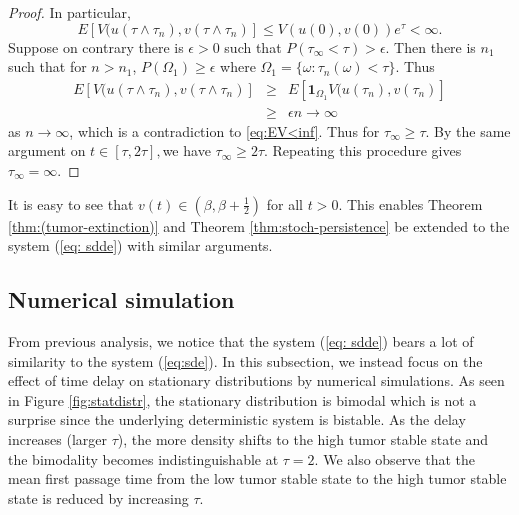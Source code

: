 \documentclass{aims}
\theoremstyle{definition}
\begin{document}
\begin{proof}
 In particular, 
 \begin{equation}
 E[V(u(\tau\land\tau_{n}),v(\tau\land\tau_{n})]\le V(u(0),v(0))e^{\tau}<\infty.\label{eq:EV<inf}
 \end{equation}
 Suppose on contrary there is $\epsilon>0$ such that $P(\tau_{\infty}<\tau)>\epsilon$.
 Then there is $n_{1}$ such that for $n>n_{1}$, $P(\Omega_{1})\ge\epsilon$
 where $\Omega_{1}=\{\omega:\tau_{n}(\omega)<\tau\}$. Thus 
 \begin{eqnarray*}
 E[V(u(\tau\land\tau_{n}),v(\tau\land\tau_{n})] & \ge & E[\boldsymbol{1}_{\Omega_{1}}V(u(\tau_{n}),v(\tau_{n})]\\
  & \ge & \epsilon n\to\infty
 \end{eqnarray*}
 as $n\to\infty$, which is a contradiction to \ref{eq:EV<inf}. Thus
 for $\tau_{\infty}\ge\tau$. By the same argument on $t\in[\tau,2\tau],$we
 have $\tau_{\infty}\ge2\tau$. Repeating this procedure gives $\tau_{\infty}=\infty$. 
 \end{proof}
It is easy to see that $v(t)\in(\beta,\beta+\frac{1}{2})$ for all $t>0$.
 This enables Theorem \ref{thm:(tumor-extinction)} and Theorem \ref{thm:stoch-persistence}
 be extended to the system (\ref{eq: sdde}) with similar arguments. 
 
 \subsection{Numerical simulation}
 
 From previous analysis, we notice that the system (\ref{eq: sdde})
 bears a lot of similarity to the system (\ref{eq:sde}). In this subsection,
 we instead focus on the effect of time delay on stationary distributions
 by numerical simulations. As seen in Figure \ref{fig:statdistr},
 the stationary distribution is bimodal which is not a surprise since
 the underlying deterministic system is bistable. As the delay increases (larger
 $\tau$), the more density shifts to the high tumor stable state and
 the bimodality becomes indistinguishable at $\tau=2$. We also observe
 that the mean first passage time from the low tumor stable state to
 the high tumor stable state is reduced by increasing $\tau$.
 
\end{document}
